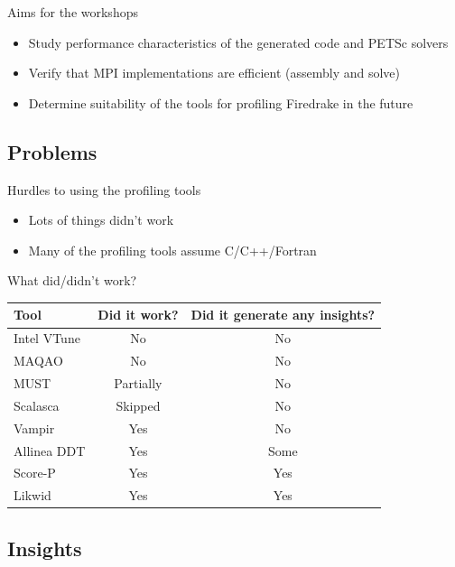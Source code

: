\documentclass[pdf,aspectratio=169]{beamer}
\begin{document}
\begin{frame}{Aims for the workshops}

  \begin{itemize}
    \item Study performance characteristics of the generated code and PETSc solvers
    \item Verify that MPI implementations are efficient (assembly and solve)
    \item Determine suitability of the tools for profiling Firedrake in the future
  \end{itemize}

\end{frame}


\subsection{Problems}

\begin{frame}{Hurdles to using the profiling tools}
  \begin{itemize}
    \item Lots of things didn't work
    \item Many of the profiling tools assume C/C++/Fortran
  \end{itemize}
\end{frame}

\begin{frame}{What did/didn't work?}
  \centering
  \begin{tabular}{l|c|c}
    \textbf{Tool} & \textbf{Did it work?} & \textbf{Did it generate any insights?} \\
    \hline
    Intel VTune & No & No \\
    MAQAO & No & No \\
    MUST & Partially & No \\
    Scalasca & Skipped & No \\
    Vampir & Yes & No \\
    \hline
    Allinea DDT & Yes & Some \\
    Score-P & Yes & Yes \\
    Likwid & Yes & Yes
  \end{tabular}
\end{frame}


\subsection{Insights}
\end{document}
